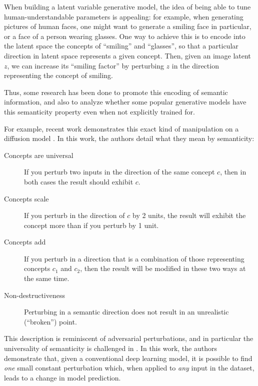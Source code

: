 \documentclass[../main.tex]{subfiles}
\begin{document}
When building a latent variable generative model, the idea of being able to tune human-understandable parameters is appealing: for example, when generating pictures of human faces, one might want to generate a smiling face in particular, or a face of a person wearing glasses.
One way to achieve this is to encode into the latent space the concepts of ``smiling'' and ``glasses'', so that a particular direction in latent space represents a given concept.
Then, given an image latent $z$, we can increase its ``smiling factor'' by perturbing $z$ in the direction representing the concept of smiling.

Thus, some research has been done to promote this encoding of semantic information, and also to analyze whether some popular generative models have this semanticity property even when not explicitly trained for.

For example, recent work demonstrates this exact kind of manipulation on a diffusion model \cite{kwonDiffusion2023}.
In this work, the authors detail what they mean by semanticity:
\begin{description}
	\item[Concepts are universal] If you perturb two inputs in the direction of the same concept $c$, then in both cases the result should exhibit $c$.
\item[Concepts scale] If you perturb in the direction of $c$ by 2 units, the result will exhibit the concept more than if you perturb by 1 unit.
\item[Concepts add] If you perturb in a direction that is a combination of those representing concepts $c_1$ and $c_2$, then the result will be modified in these two ways at the same time.
	\item[Non-destructiveness] Perturbing in a semantic direction does not result in an unrealistic (``broken'') point.
\end{description}

This description is reminiscent of adversarial perturbations, and in particular the universality of semanticity is challenged in \cite{moosavi-dezfooliUniversal2017}.
In this work, the authors demonstrate that, given a conventional deep learning model, it is possible to find \emph{one} small constant perturbation which, when applied to \emph{any} input in the dataset, leads to a change in model prediction.


\end{document}
